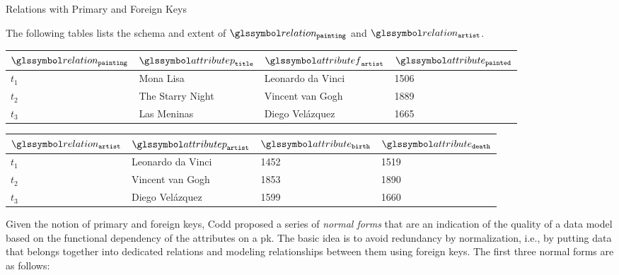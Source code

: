 \begin{example}[label=example:relational_table_pkfk]{Relations with Primary and Foreign Keys}{}
    
    The following tables lists the schema and extent of $\relation_{\mathtt{painting}}$ and $\relation_{\mathtt{artist}}$.
    \begin{center}
        \begin{tabular}{ l || l | l | l |}
            $\relation_{\mathtt{painting}}$ & $\attributep_{\mathtt{title}}$  & $\attributef_{\mathtt{artist}}$  & $\attribute_{\mathtt{painted}}$ \\ 
            \hline
            \hline
            $t_1$ & Mona Lisa &  Leonardo da Vinci & 1506 \\
            \hline
            $t_2$ & The Starry Night & Vincent van Gogh & 1889 \\
            \hline
            $t_3$ & Las Meninas & Diego Velázquez & 1665 \\
            \hline
        \end{tabular}
    \end{center}

    \begin{center}
        \begin{tabular}{ l || l | l | l |}
            $\relation_{\mathtt{artist}}$ & $\attributep_{\mathtt{artist}}$ & $\attribute_{\mathtt{birth}}$ & $\attribute_{\mathtt{death}}$\\ 
            \hline
            \hline
            $t_1$ & Leonardo da Vinci & 1452 & 1519 \\
            \hline
            $t_2$ & Vincent van Gogh & 1853 & 1890 \\
            \hline
            $t_3$ & Diego Velázquez & 1599 & 1660 \\
            \hline
        \end{tabular}
    \end{center}
\end{example}

Given the notion of primary and foreign keys, Codd proposed a series of \emph{normal forms} that are an indication of the quality of a data model based on the functional dependency of the attributes on a \acrshort{pk}. The basic idea is to avoid redundancy by normalization, i.e., by putting data that belongs together into dedicated relations and modeling relationships between them using foreign keys. The first three normal forms are as follows:

